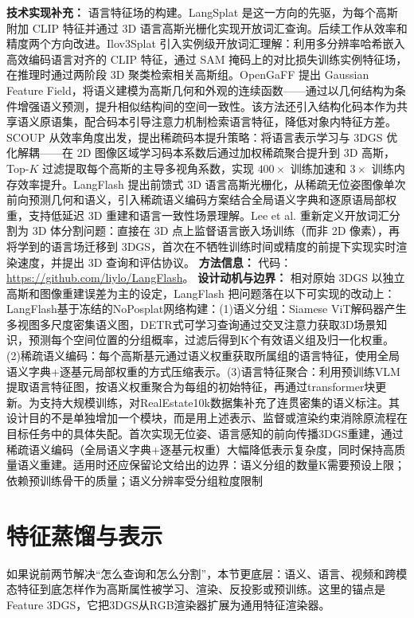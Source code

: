 \textbf{技术实现补充：} 语言特征场的构建。LangSplat 是这一方向的先驱，为每个高斯附加 CLIP 特征并通过 3D 语言高斯光栅化实现开放词汇查询。后续工作从效率和精度两个方向改进。Ilov3Splat 引入实例级开放词汇理解：利用多分辨率哈希嵌入高效编码语言对齐的 CLIP 特征，通过 SAM 掩码上的对比损失训练实例特征场，在推理时通过两阶段 3D 聚类检索相关高斯组。OpenGaFF 提出 Gaussian Feature Field，将语义建模为高斯几何和外观的连续函数——通过以几何结构为条件增强语义预测，提升相似结构间的空间一致性。该方法还引入结构化码本作为共享语义原语集，配合码本引导注意力机制检索语言特征，降低对象内特征方差。SCOUP 从效率角度出发，提出稀疏码本提升策略：将语言表示学习与 3DGS 优化解耦——在 2D 图像区域学习码本系数后通过加权稀疏聚合提升到 3D 高斯，Top-$K$ 过滤提取每个高斯的主导多视角系数，实现 $400\times$ 训练加速和 $3\times$ 训练内存效率提升。LangFlash 提出前馈式 3D 语言高斯光栅化，从稀疏无位姿图像单次前向预测几何和语义，引入稀疏语义编码方案结合全局语义字典和逐原语局部权重，支持低延迟 3D 重建和语言一致性场景理解。Lee et al. 重新定义开放词汇分割为 3D 体分割问题：直接在 3D 点上监督语言嵌入场训练（而非 2D 像素），再将学到的语言场迁移到 3DGS，首次在不牺牲训练时间或精度的前提下实现实时渲染速度，并提出 3D 查询和评估协议。
\textbf{方法信息：} 代码：\url{https://github.com/liylo/LangFlash}。
\textbf{设计动机与边界：} 相对原始 3DGS 以独立高斯和图像重建误差为主的设定，LangFlash 把问题落在以下可实现的改动上：LangFlash基于冻结的NoPosplat网络构建：(1)语义分组：Siamese ViT解码器产生多视图多尺度密集语义图，DETR式可学习查询通过交叉注意力获取3D场景知识，预测每个空间位置的分组概率，过滤后得到K个有效语义组及归一化权重。(2)稀疏语义编码：每个高斯基元通过语义权重获取所属组的语言特征，使用全局语义字典+逐基元局部权重的方式压缩表示。(3)语言特征聚合：利用预训练VLM提取语言特征图，按语义权重聚合为每组的初始特征，再通过transformer块更新。为支持大规模训练，对RealEstate10k数据集补充了连贯密集的语义标注。其设计目的不是单独增加一个模块，而是用上述表示、监督或渲染约束消除原流程在目标任务中的具体失配。首次实现无位姿、语言感知的前向传播3DGS重建，通过稀疏语义编码（全局语义字典+逐基元权重）大幅降低表示复杂度，同时保持高质量语义重建。适用时还应保留论文给出的边界：语义分组的数量K需要预设上限；依赖预训练骨干的质量；语义分辨率受分组粒度限制

\section{特征蒸馏与表示}

如果说前两节解决“怎么查询和怎么分割”，本节更底层：语义、语言、视频和跨模态特征到底怎样作为高斯属性被学习、渲染、反投影或预训练。这里的锚点是Feature 3DGS，它把3DGS从RGB渲染器扩展为通用特征渲染器。
